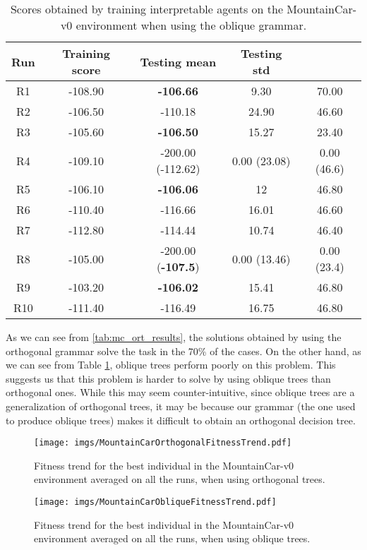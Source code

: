 \documentclass[review,english]{elsarticle}
\begin{document}
\begin{table}
    \centering
    \begin{tabular}{|c|c|c|c|c|} \hline
        \textbf{Run} & \textbf{Training score} & \textbf{Testing mean} & \textbf{Testing std} & \textbf{} \\ \hline
        R1 & -108.90 & \textbf{-106.66} & 9.30 & 70.00 \\ R2 & -106.50 & -110.18 & 24.90 & 46.60 \\ R3 & -105.60 & \textbf{-106.50} & 15.27 & 23.40 \\ R4 & -109.10 & -200.00 (-112.62) & 0.00 (23.08) & 0.00 (46.6) \\ R5 & -106.10 & \textbf{-106.06} & 12 & 46.80 \\ R6 & -110.40 & -116.66 & 16.01 & 46.60 \\ R7 & -112.80 & -114.44 & 10.74 & 46.40 \\ R8 & -105.00 & -200.00 (\textbf{-107.5}) & 0.00 (13.46) & 0.00 (23.4) \\ R9 & -103.20 & \textbf{-106.02} & 15.41 & 46.80 \\ R10 & -111.40 & -116.49 & 16.75 & 46.80 \\ \hline
    \end{tabular}
    \caption{Scores obtained by training interpretable agents on the MountainCar-v0 environment when using the oblique grammar.}
    \label{tab:mc_obl_results}
\end{table}


As we can see from \ref{tab:mc_ort_results}, the solutions obtained by using the orthogonal grammar solve the task in the 70\% of the cases.
On the other hand, as we can see from Table \ref{tab:mc_obl_results}, oblique trees perform poorly on this problem.
This suggests us that this problem is harder to solve by using oblique trees than orthogonal ones.
While this may seem counter-intuitive, since oblique trees are a generalization of orthogonal trees, it may be because our grammar (the one used to produce oblique trees) makes it difficult to obtain an orthogonal decision tree.

\begin{figure}[p]
    \centering
    \texttt{[image: imgs/MountainCarOrthogonalFitnessTrend.pdf]}
    \caption{Fitness trend for the best individual in the MountainCar-v0 environment averaged on all the runs, when using orthogonal trees.}
    \label{fig:mc_ort_fitnesstrend}
\end{figure}

\begin{figure}[p]
    \centering
    \texttt{[image: imgs/MountainCarObliqueFitnessTrend.pdf]}
    \caption{Fitness trend for the best individual in the MountainCar-v0 environment averaged on all the runs, when using oblique trees.}
    \label{fig:mc_obl_fitnesstrend}
\end{figure}
\end{document}
